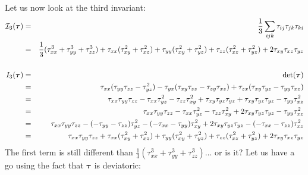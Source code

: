 Let us now look at the third invariant:
\begin{eqnarray}
{\cal I}_3(\bm\tau) 
&=& \frac13 \sum_{ijk} \tau_{ij}\tau_{jk}\tau_{ki} \nonumber\\
&=& \frac{1}{3}(\tau_{xx}^3 + \tau_{yy}^3 + \tau_{zz}^3) 
+\tau_{xx}(\tau_{xy}^2 + \tau_{xz}^2 ) 
+\tau_{yy}(\tau_{xy}^2 + \tau_{yz}^2 ) 
+\tau_{zz}(\tau_{xz}^2 + \tau_{yz}^2 ) 
+2\tau_{xy}\tau_{xz}\tau_{yz} 
\nonumber\\
\nonumber\\
I_3(\bm\tau) 
&=& {\rm det}(\bm \tau)  \nonumber\\
&=& \tau_{xx}   ( \tau_{yy}\tau_{zz} - \tau_{yz}^2   ) 
-\tau_{yx} (\tau_{xy}\tau_{zz} - \tau_{zy} \tau_{xz}  )
+\tau_{zx} (\tau_{xy}\tau_{yz} - \tau_{yy}\tau_{xz}  )\nonumber\\
&=&
\tau_{xx}   \tau_{yy}\tau_{zz} 
-\tau_{xx} \tau_{yz}^2   
-\tau_{zz} \tau_{xy}^2
+\tau_{xy}\tau_{yz}\tau_{yz}
+\tau_{xy}\tau_{yz}\tau_{yz}
-\tau_{yy} \tau_{xz}^2 \nonumber\\
&=&
\tau_{xx}   \tau_{yy}\tau_{zz} 
-\tau_{xx} \tau_{yz}^2   
-\tau_{zz} \tau_{xy}^2
+2\tau_{xy}\tau_{yz}\tau_{yz}
-\tau_{yy} \tau_{xz}^2 \nonumber\\
&=&
\tau_{xx}   \tau_{yy}\tau_{zz} 
-(-\tau_{yy}-\tau_{zz} )\tau_{yz}^2   
-(-\tau_{xx}-\tau_{yy}) \tau_{xy}^2
+2\tau_{xy}\tau_{yz}\tau_{yz}
-(-\tau_{xx}-\tau_{zz}) \tau_{xz}^2 \nonumber\\
&=& 
\tau_{xx}   \tau_{yy}\tau_{zz} 
+\tau_{xx}(\tau_{xy}^2 + \tau_{xz}^2 )
+\tau_{yy}(\tau_{xy}^2 + \tau_{yz}^2 )
+\tau_{zz}(\tau_{xz}^2 + \tau_{yz}^2 )
+2\tau_{xy}\tau_{xz}\tau_{yz} \nonumber
\end{eqnarray}
The first term is still different than $\frac13(\tau_{xx}^3 + \tau_{yy}^3 + \tau_{zz}^3)$... or is it?
Let us have a go using the fact that $\bm\tau$ is deviatoric:
